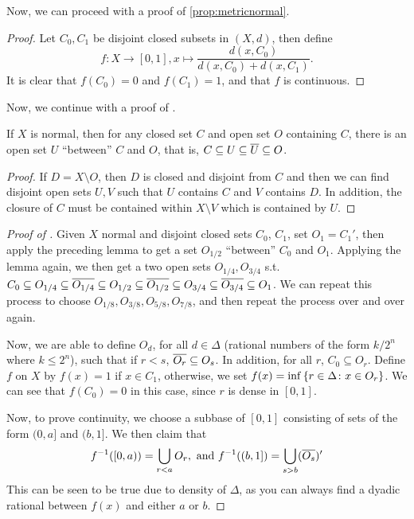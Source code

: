 Now, we can proceed with a proof of \autoref{prop:metricnormal}.

\begin{proof}
    Let $C_0, C_1$ be disjoint closed subsets in $(X, d)$, then define \[f\colon X \to [0, 1], x \mapsto \frac{d(x, C_0)}{d(x, C_0) + d(x, C_1)}.\] It is clear that $f(C_0) = 0$ and $f(C_1) = 1$, and that $f$ is continuous.
\end{proof}

Now, we continue with a proof of .

\begin{lemma}
    If $X$ is normal, then for any closed set $C$ and open set $O$ containing $C$, there is an open set $U$ ``between'' $C$ and $O$, that is, $C \subseteq U \subseteq \overline U \subseteq O$.
\end{lemma}

\begin{proof}
    If $D = X \setminus O$, then $D$ is closed and disjoint from $C$ and then we can find disjoint open sets $U, V$ such that $U$ contains $C$ and $V$ contains $D$. In addition, the closure of $C$ must be contained within $X \setminus V$ which is contained by $U$. 
\end{proof}

\begin{proof}[Proof of ]
    Given $X$ normal and disjoint closed sets $C_0$, $C_1$, set $O_1 = C_1'$, then apply the preceding lemma to get a set $O_{1/2}$ ``between'' $C_0$ and $O_1$. Applying the lemma again, we then get a two open sets $O_{1/4}, O_{3/4}$ s.t. $C_0 \subseteq O_{1/4} \subseteq \overline{O_{1/4}} \subseteq O_{1/2} \subseteq \overline{O_{1/2}} \subseteq O_{3/4} \subseteq \overline{O_{3/4}} \subseteq O_1$. We can repeat this process to choose $O_{1/8}, O_{3/8}, O_{5/8}, O_{7/8}$, and then repeat the process over and over again.

    Now, we are able to define $O_{d}$, for all $d \in \Delta$ (rational numbers of the form $k/2^n$ where $k \le 2^n$), such that if $r < s$, $\overline{O_r} \subseteq O_s$. In addition, for all $r$, $C_0 \subseteq O_r$. Define $f$ on $X$ by $f(x) = 1$ if $x \in C_1$, otherwise, we set $f(x) = \inf \qty{r \in \Delta \colon x \in O_r}$. We can see that $f(C_0) = 0$ in this case, since $r$ is dense in $[0, 1]$.

    Now, to prove continuity, we choose a subbase of $[0, 1]$ consisting of sets of the form $(0, a]$ and $(b, 1]$. We then claim that \[f^{-1}([0, a)) = \bigcup_{r < a} O_r,\text{ and } f^{-1}((b, 1]) = \bigcup_{s > b} (\overline{O_s})'\]
    This can be seen to be true due to density of $\Delta$, as you can always find a dyadic rational between $f(x)$ and either $a$ or $b$. 
\end{proof}

